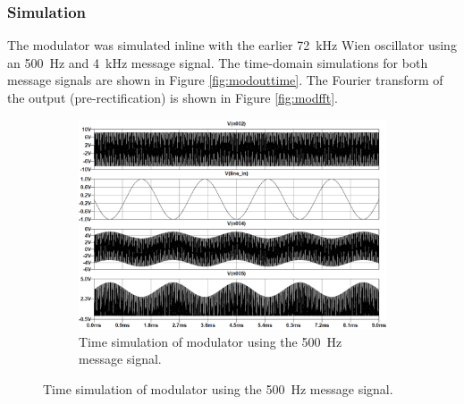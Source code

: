 \documentclass[11pt,letter,notitlepage]{article}
\begin{document}
	\subsubsection{Simulation}
	The modulator was simulated inline with the earlier \SI{72}{\kHz} Wien oscillator using an \SI{500}{\Hz} and \SI{4}{\kHz} message signal. The time-domain simulations for both message signals are shown in Figure \ref{fig:modouttime}. The Fourier transform of the output (pre-rectification) is shown in Figure \ref{fig:modfft}.
	
	\begin{figure}[h]
		\centering
		\begin{subfigure}{0.9\linewidth}
			\centering
			\includegraphics[width=\linewidth]{modulator/modout500img}
			\caption{Time simulation of modulator using the \SI{500}{\Hz} message signal.}
			\label{fig:modout500img}
		\end{subfigure}
				

\end{figure}
\end{document}
